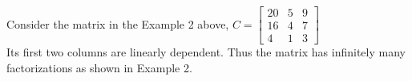 

Consider the matrix in the Example 2 above, 
$C=\begin{bmatrix}
20 & 5 & 9\\
16 & 4 & 7\\
4 & 1 & 3
\end{bmatrix}
$
\newline
\\
\noindent
Its first two columns are linearly dependent. Thus the matrix has infinitely many factorizations as shown in Example 2.
\newline
\\